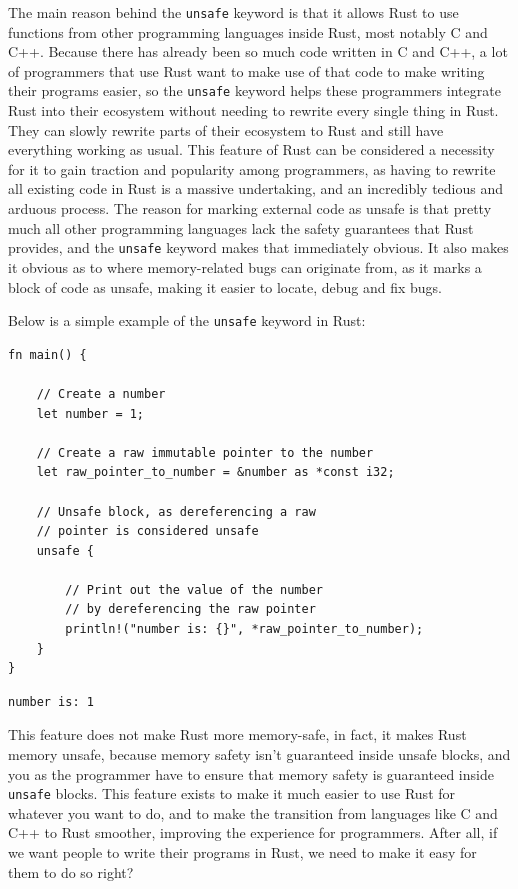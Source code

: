 \documentclass[11pt]{article}
\begin{document}
The main reason behind the \texttt{unsafe} keyword is
that it allows Rust to use functions from other
programming languages inside Rust, most notably
C and C++. Because there has already been so much
code written in C and C++, a lot of programmers that
use Rust want to make use of that code to make
writing their programs easier, so the \texttt{unsafe}
keyword helps these programmers integrate Rust
into their ecosystem without needing to rewrite
every single thing in Rust. They can slowly
rewrite parts of their ecosystem to Rust
and still have everything working as usual.
This feature of Rust can be considered a
necessity for it to gain traction and
popularity among programmers, as having
to rewrite all existing code in Rust
is a massive undertaking, and an
incredibly tedious and arduous process.
The reason for marking external code as
unsafe is that pretty much all other
programming languages lack the safety guarantees that
Rust provides, and the \texttt{unsafe} keyword
makes that immediately obvious.
It also makes it obvious as to where
memory-related bugs can originate from,
as it marks a block of code as unsafe,
making it easier to locate, debug
and fix bugs.

 \newpage

Below is a simple example of
the \texttt{unsafe} keyword in Rust:
\begin{verbatim}
fn main() {

    // Create a number
    let number = 1;

    // Create a raw immutable pointer to the number
    let raw_pointer_to_number = &number as *const i32;

    // Unsafe block, as dereferencing a raw
    // pointer is considered unsafe
    unsafe {

        // Print out the value of the number
        // by dereferencing the raw pointer
        println!("number is: {}", *raw_pointer_to_number);
    }
}
\end{verbatim}

\begin{verbatim}
number is: 1
\end{verbatim}

This feature does not make Rust more memory-safe,
in fact, it makes Rust memory unsafe, because
memory safety isn't guaranteed inside
unsafe blocks, and you as the programmer
have to ensure that memory safety is guaranteed
inside \texttt{unsafe} blocks. This feature exists
to make it much easier to use Rust for
whatever you want to do, and to make
the transition from languages like
C and C++ to Rust smoother, improving
the experience for programmers. After all,
if we want people to write their programs
in Rust, we need to make it easy for them
to do so right?
\end{document}
